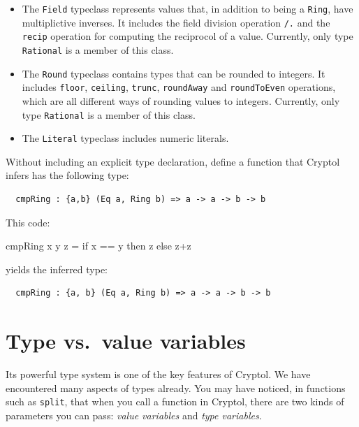\begin{itemize}
\item
The \texttt{Field} typeclass represents values that, in addition to
being a \texttt{Ring}, have multiplictive inverses.
It includes the field division operation \texttt{/.} and the
\texttt{recip} operation for computing the reciprocol of a value.
Currently, only type \texttt{Rational} is a member of this class.

\item
 The \texttt{Round} typeclass contains types that can be
 rounded to integers.  It includes \texttt{floor}, \texttt{ceiling},
 \texttt{trunc}, \texttt{roundAway} and \texttt{roundToEven}
 operations, which are all different ways of rounding values to
 integers. Currently, only type \texttt{Rational} is a member of this class.

\item
The \texttt{Literal} typeclass includes numeric literals.
\end{itemize}

\begin{Exercise}\label{ex:tvar:1}
  Without including an explicit type declaration, define a function
  that Cryptol infers has the following type:
\begin{Verbatim}
  cmpRing : {a,b} (Eq a, Ring b) => a -> a -> b -> b
\end{Verbatim}
\end{Exercise}
\begin{Answer}
This code:
\begin{code}
  cmpRing x y z = if x == y then z else z+z
\end{code}
yields the inferred type:
\begin{Verbatim}
  cmpRing : {a, b} (Eq a, Ring b) => a -> a -> b -> b
\end{Verbatim}
\end{Answer}

\section{Type vs.\ value variables}\indTypeVariables
\label{sec:type-vs.-value}


Its powerful type system is one of the key features of Cryptol. We
have encountered many aspects of types already. You may have noticed,
in functions such as \texttt{split}, that when you call a function in
Cryptol, there are two kinds of parameters you can pass: \textit{value
  variables} and \textit{type variables}.

